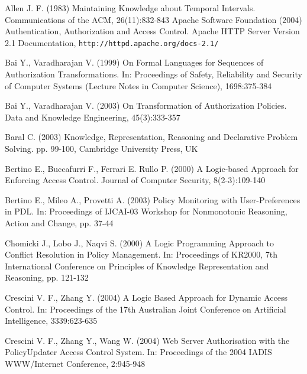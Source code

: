 \documentclass[glov2,twocolumn,final]{svjour2}
\begin{document}
  \begin{thebibliography}{5}
      Allen J. F.
      (1983)
      Maintaining Knowledge about Temporal Intervals.
      Communications of the ACM,
      26(11):832-843
      Apache Software Foundation
      (2004)
      Authentication, Authorization and Access Control.
      Apache HTTP Server Version 2.1 Documentation,
      {\tt \scriptsize http://httpd.apache.org/docs-2.1/}

      Bai Y., Varadharajan V.
      (1999)
      On Formal Languages for Sequences of Authorization Transformations.
      In: Proceedings of Safety, Reliability and Security of Computer
      Systems (Lecture Notes in Computer Science),
      1698:375-384

      Bai Y., Varadharajan V.
      (2003)
      On Transformation of Authorization Policies.
      Data and Knowledge Engineering,
      45(3):333-357

      Baral C.
      (2003)
      Knowledge, Representation, Reasoning and Declarative Problem
      Solving.
      pp. 99-100, Cambridge University Press, UK

      Bertino E., Buccafurri F., Ferrari E. Rullo P.
      (2000)
      A Logic-based Approach for Enforcing Access Control.
      Journal of Computer Security,
      8(2-3):109-140

      Bertino E., Mileo A., Provetti A.
      (2003)
      Policy Monitoring with User-Preferences in PDL.
      In: Proceedings of IJCAI-03 Workshop for Nonmonotonic Reasoning,
      Action and Change,
      pp. 37-44

      Chomicki J., Lobo J., Naqvi S.
      (2000)
      A Logic Programming Approach to Conflict Resolution in Policy Management.
      In:  Proceedings of KR2000, 7th International Conference on Principles
      of Knowledge Representation and Reasoning,
      pp. 121-132

      Crescini V. F., Zhang Y.
      (2004)
      A Logic Based Approach for Dynamic Access Control.
      In: Proceedings of the 17th Australian Joint Conference on Artificial
      Intelligence,
      3339:623-635

      Crescini V. F., Zhang Y., Wang W.
      (2004)
      Web Server Authorisation with the PolicyUpdater Access Control System.
      In: Proceedings of the 2004 IADIS WWW/Internet Conference,
      2:945-948


\end{thebibliography}
\end{document}
